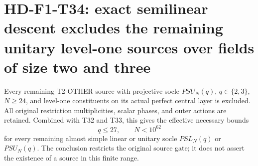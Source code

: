 \section[HD-F1-T34: unitary level-one semilinear exclusion]{HD-F1-T34: exact semilinear descent excludes the remaining unitary level-one sources over fields of size two and three}
\label{sec:f1-unitary-level-one-semilinear-exclusion}

Every remaining T2-OTHER source with projective socle
\(PSU_N(q)\), \(q\in\{2,3\}\), \(N\ge24\), and
level-one constituents on its actual perfect central
layer is excluded. All original restriction
multiplicities, scalar phases, and outer actions are
retained. Combined with T32 and T33, this gives the
effective necessary bounds
\[
 \boxed{\qquad q\le27,\qquad N<10^{62}\qquad}
 \tag{F1T34.1}
\]
for every remaining almost simple linear or unitary
socle \(PSL_N(q)\) or \(PSU_N(q)\). The conclusion
restricts the original source gate; it does not assert
the existence of a source in this finite range.

